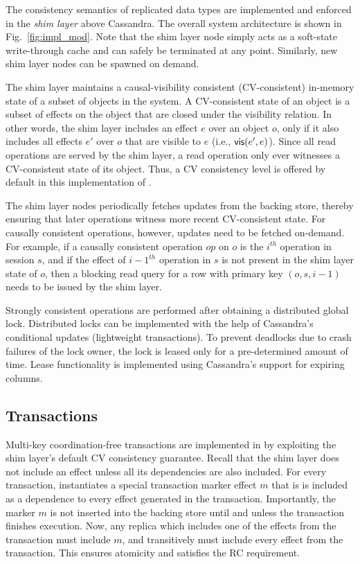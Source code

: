 The consistency semantics of replicated data types are implemented and
enforced in the \emph{shim layer} above Cassandra. The overall system
architecture is shown in Fig.~\ref{fig:impl_mod}. Note that the shim
layer node simply acts as a soft-state write-through cache and can
safely be terminated at any point. Similarly, new shim layer nodes can
be spawned on demand.

The shim layer maintains a causal-visibility consistent
(CV-consistent) in-memory state of a subset of objects in the system.
A CV-consistent state of an object is a subset of effects on the
object that are closed under the visibility relation.  In other words,
the shim layer includes an effect $e$ over an object $o$, only if it
also includes all effects $e'$ over $o$ that are visible to $e$ (i.e.,
${\normalfont \textsf{vis}(e',e)}$). Since all read operations are served by the shim
layer, a read operation only ever witnesses a CV-consistent state of its
object. Thus, a CV consistency level is offered by default in this
implementation of \name.

The shim layer nodes periodically fetches updates from the backing
store, thereby ensuring that later operations witness more recent
CV-consistent state. For causally consistent operations, however,
updates need to be fetched on-demand. For example, if a causally
consistent operation $op$ on $o$ is the $i^{th}$ operation in session
$s$, and if the effect of ${i-1}^{th}$ operation in $s$ is not present
in the shim layer state of $o$, then a blocking read query for a row
with primary key $(o,s,i-1)$ needs to be issued by the shim layer.

Strongly consistent operations are performed after obtaining a
distributed global lock. Distributed locks can be implemented with the
help of Cassandra's conditional updates (lightweight transactions). To
prevent deadlocks due to crash failures of the lock owner, the lock is
leased only for a pre-determined amount of time. Lease functionality
is implemented using Cassandra's support for expiring columns.

\subsection{Transactions}

Multi-key coordination-free transactions are implemented in \name by
exploiting the shim layer's default CV consistency guarantee. Recall that
the shim layer does not include an effect unless all its
dependencies are also included. For every transaction, \name
instantiates a special transaction marker effect $m$ that is is
included as a dependence to every effect generated in the transaction.
Importantly, the marker $m$ is not inserted into the backing store
until and unless the transaction finishes execution. Now, any replica
which includes one of the effects from the transaction must include
$m$, and transitively must include every effect from the transaction.
This ensures atomicity and satisfies the RC requirement.

